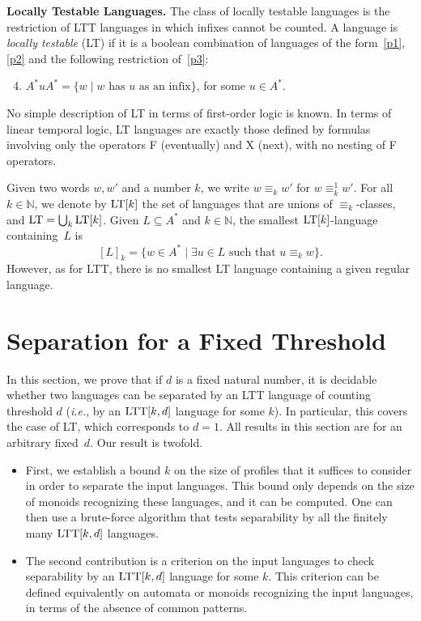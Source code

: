 \documentclass{LMCS}
\newcommand\nat{\ensuremath{\mathbb{N}}\xspace}
\newcommand{\lt}{\textup{LT}\xspace}
\newcommand{\ltt}{\textup{LTT}\xspace}
\newcommand\ltteq[2]{\ensuremath{\equiv_{#1}^{#2}}\xspace}
\newcommand\lteq[1]{\ensuremath{\equiv_{#1}}\xspace}
\newcommand\klteq{\lteq{k}}
\newcommand{\ltclos}[2]{\ensuremath{[#1]_{#2}}}
\theoremstyle{plain}
\begin{document}
\medskip
\noindent
{\textbf{Locally Testable Languages.}} The class of locally
testable languages is the restriction of \ltt languages in which
infixes cannot be counted. A language 
is \emph{locally testable} (\lt) if it is a boolean combination of
languages of the form~\eqref{p1}, \eqref{p2} and the following
restriction of~\eqref{p3}:

\begin{enumerate}
\setcounter{enumi}{3}
\item\label{p4} $ A^* u A^* = \{w \mid \text{$w$ has $u$ as an infix}\}$, for some $u \in A^{*}$.
\end{enumerate}

No simple description of \lt in terms of first-order logic is known.
In terms of linear temporal logic, \lt languages are exactly those defined by
formulas involving only the operators \textsf{F} (eventually) and
\textsf{X} (next), with no nesting of \textsf{F} operators.

Given two words $w,w'$ and a number $k$, we write $w \klteq w'$ 
for $w \ltteq{k}{1} w'$. For all $k \in \mathbb{N}$, we denote by $\lt[k]$ the 
set of languages that are unions of \klteq-classes, and
$\lt=\bigcup_{k}\lt[k]$. Given $L\subseteq A^*$ and $k\in\nat$, the
smallest $\lt[k]$-language containing~$L$ is
$$\ltclos{L}{k}=\{w\in A^*\mid \exists u\in L\text{ such that }u\klteq
w\}.$$
However, as for \ltt, there is no smallest \lt language containing a given
regular language.




\section{Separation for a Fixed Threshold}
\label{sec:boundk}
\makeatletter{}In this section, we prove that if $d$ is a fixed natural number,
it is decidable whether two languages can be separated by an
\ltt language of counting threshold $d$ (\emph{i.e.}, by an
$\ltt[k,d]$ language for some $k$). In particular, this covers the
case of \lt, which corresponds to $d=1$. All results in this section are
for an arbitrary fixed~$d$. Our result is twofold.

\begin{itemize}
\item First, we establish a bound $k$ on the size of profiles that it 
  suffices to consider in order to separate the input languages. This
  bound only depends on the size of monoids recognizing these languages,
  and it can be computed. One can then use a brute-force algorithm
  that tests separability by all the finitely many $\ltt[k,d]$
  languages.
\item The second contribution is a criterion on the input languages to
  check separability by an $\ltt[k,d]$ language for some $k$. This
  criterion can be defined equivalently on automata or monoids
  recognizing the input languages, in terms of the absence of common patterns.
\end{itemize}
\end{document}

